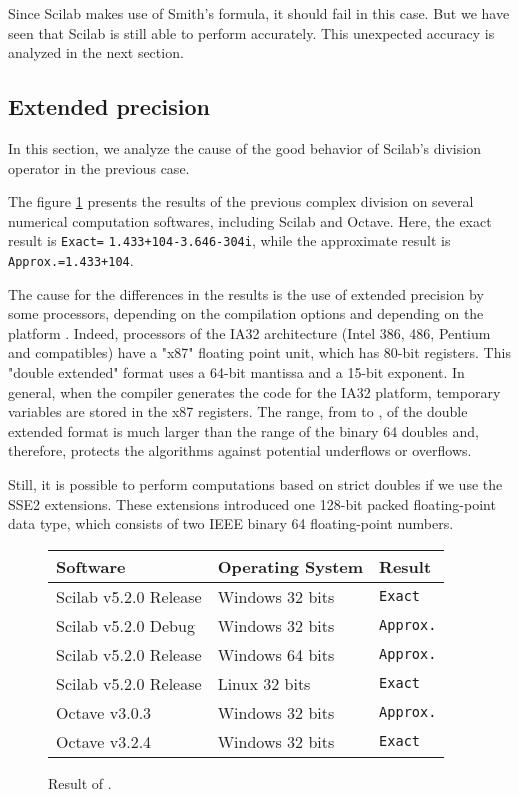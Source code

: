 \documentclass{paper}
\newcommand{\scivar}[1]{\texttt{#1}}
\begin{document}
Since Scilab makes use of Smith's formula, it should fail in this 
case. 
But we have seen that Scilab is still able to perform accurately.
This unexpected accuracy is analyzed in the next section. 


\subsection{Extended precision}

In this section, we analyze the cause of the good behavior of 
Scilab's division operator in the previous case. 

The figure \ref{fig-compdiv-weird} presents the results of the 
previous complex division on several numerical computation softwares, 
including Scilab and Octave.
Here, the exact result is \scivar{Exact=} \scivar{1.433+104-3.646-304i}, 
while the approximate result is \scivar{Approx.=1.433+104}.

The cause for the differences in the results is the use of extended precision 
by some processors, depending on the compilation options and depending on the 
platform \cite{MullerEtAl2010,Monniaux2008}. 
Indeed, processors of the IA32 architecture (Intel 386, 486, Pentium and 
compatibles) have a "x87" floating point unit, which has 80-bit registers. 
This "double extended" format uses a 64-bit mantissa and a 15-bit exponent. 
In general, when the compiler generates the code for the IA32 platform, 
temporary variables are stored in the x87 registers. 
The range, from  to , 
of the double extended format is much larger than the range 
of the binary 64 doubles and, therefore, protects the algorithms against 
potential underflows or overflows. 

Still, it is possible to perform computations based on strict doubles if 
we use the SSE2 extensions. 
These extensions introduced one 128-bit packed floating-point 
data type, which consists of two IEEE binary 64 floating-point 
numbers. 

\begin{figure}
\caption{
Result of .
}
\label{fig-compdiv-weird}
\begin{center}
\begin{tabular}{l|l|l}
\textbf{Software} & \textbf{Operating System} & \textbf{Result} \\
\hline
Scilab v5.2.0 Release & Windows 32 bits & \scivar{Exact} \\
Scilab v5.2.0 Debug   & Windows 32 bits & \scivar{Approx.} \\
Scilab v5.2.0 Release & Windows 64 bits & \scivar{Approx.} \\
Scilab v5.2.0 Release & Linux 32 bits   & \scivar{Exact} \\
Octave v3.0.3         & Windows 32 bits & \scivar{Approx.} \\
Octave v3.2.4         & Windows 32 bits & \scivar{Exact}
\end{tabular}
\end{center}
\end{figure}
\end{document}
